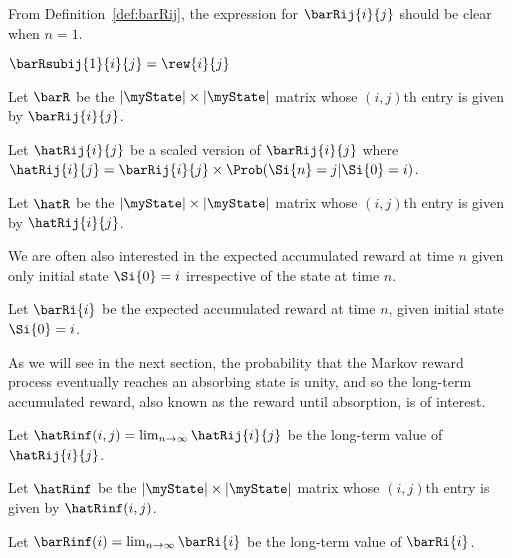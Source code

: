 From Definition~\ref{def:barRij}, the expression for $\barRij{i}{j}$ should be clear when $n = 1$.

\begin{mycor}
	\label{cor:barR1}
	$\barRsubij{1}{i}{j} = \rew{i}{j}$
\end{mycor}

\begin{mydef}
	Let $\barR$ be the $|\myState| \times |\myState|$ matrix whose $(i, j)$th entry is given by $\barRij{i}{j}$.
\end{mydef}

\begin{mydef}
	\label{def:hatRij}
	Let $\hatRij{i}{j}$ be a scaled version of $\barRij{i}{j}$ where $\hatRij{i}{j} = \barRij{i}{j} \times \Prob(\Si{n} = j | \Si{0} = i)$.
\end{mydef}

\begin{mydef}
	Let $\hatR$ be the $|\myState| \times |\myState|$ matrix whose $(i, j)$th entry is given by $\hatRij{i}{j}$.
\end{mydef}


We are often also interested in the expected accumulated reward at time $n$ given only initial state $\Si{0} = i$ irrespective of the state at time $n$.

\begin{mydef}
\label{def:barRi}
	Let $\barRi{i}$ be the expected accumulated reward at time $n$, given initial state $\Si{0} = i$.
\end{mydef}

As we will see in the next section, the probability that the Markov reward process eventually reaches an absorbing state is unity, and so the long-term accumulated reward, also known as the reward until absorption, is of interest.

\begin{mydef}
	Let $\hatRinf(i, j) = \lim_{n \to \infty} \hatRij{i}{j}$ be the long-term value of $\hatRij{i}{j}$.
\end{mydef}

\begin{mydef}
	Let $\hatRinf$ be the $|\myState| \times |\myState|$ matrix whose $(i, j)$th entry is given by $\hatRinf(i, j)$.
\end{mydef}

\begin{mydef}
\label{def:barRinfi}
	Let $\barRinf(i) = \lim_{n \to \infty} \barRi{i}$ be the long-term value of $\barRi{i}$.
\end{mydef}


